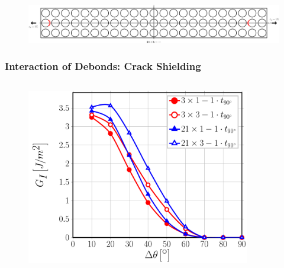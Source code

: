 \documentclass[first,firstsupp,lastsupp,last,hyperref,table]{ETHclass}
\begin{document}
\begin{frame}
\begin{columns}[c]
\begin{column}{0.5\textwidth}
\begin{figure}
\end{figure}
\end{column}
\end{columns}
\begin{figure}
\centering
\includegraphics[width=\textwidth]{twofibers-sameside-crackshielding21.pdf}
\end{figure}
\end{frame}

\addtocounter{framenumber}{-1}

\begin{frame}
\frametitle{\vspace{0.2cm}\small Interaction of Debonds: Crack Shielding}
\vspace{-.75cm}
\centering
\begin{columns}[c]
\centering
\begin{column}{0.5\textwidth}
\centering
\begin{figure}
\centering
\includegraphics[width=\columnwidth]{nxk-1-vf60-GI-crackshield3.pdf}
\end{figure}
\end{column}
\begin{column}{0.5\textwidth}
\centering
\begin{figure}
\centering

\end{figure}
\end{column}
\end{columns}
\end{frame}
\end{document}
